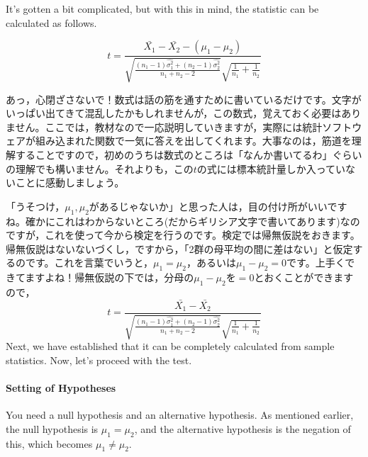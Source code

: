 \documentclass{ltjsbook}
\begin{document}
It's gotten a bit complicated, but with this in mind, the statistic can be calculated as follows.

\[ t = \frac{\bar{X_1}-\bar{X_2}-(\mu_1-\mu_2)}{\sqrt{\frac{(n_1-1)\hat{\sigma_1^2}+(n_2-1)\hat{\sigma_2^2}}{n_1+n_2 - 2}}\sqrt{\frac{1}{n_1}+\frac{1}{n_2}}}\]

あっ，心閉ざさないで！数式は話の筋を通すために書いているだけです。文字がいっぱい出てきて混乱したかもしれませんが，この数式，覚えておく必要はありません。ここでは，教材なので一応説明していきますが，実際には統計ソフトウェアが組み込まれた関数で一気に答えを出してくれます。大事なのは，筋道を理解することですので，初めのうちは数式のところは「なんか書いてるわ」ぐらいの理解でも構いません。それよりも，この$t$の式には標本統計量しか入っていないことに感動しましょう。

「うそつけ，$\mu_1,\mu_2$があるじゃないか」と思った人は，目の付け所がいいですね。確かにこれはわからないところ(だからギリシア文字で書いてあります)なのですが，これを使って今から検定を行うのです。検定では帰無仮説をおきます。帰無仮説はないないづくし，ですから，「2群の母平均の間に差はない」と仮定するのです。これを言葉でいうと，$\mu_1=\mu_2$，あるいは$\mu_1-\mu_2=0$です。上手くできてますよね！帰無仮説の下では，分母の$\mu_1-\mu_2$を$=0$とおくことができますので，
\[ t = \frac{\bar{X_1}-\bar{X_2}}{\sqrt{\frac{(n_1-1)\hat{\sigma_1^2}+(n_2-1)\hat{\sigma_2^2}}{n_1+n_2 - 2}}\sqrt{\frac{1}{n_1}+\frac{1}{n_2}}}\]
Next, we have established that it can be completely calculated from sample statistics. Now, let's proceed with the test.
\paragraph{Setting of Hypotheses}You need a null hypothesis and an alternative hypothesis. As mentioned earlier, the null hypothesis is $\mu_1=\mu_2$, and the alternative hypothesis is the negation of this, which becomes $\mu_1 \neq \mu_2$.
\end{document}
